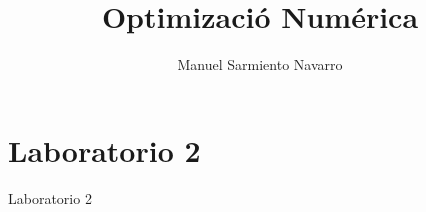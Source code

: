 \documentclass{article}
\begin{document}


\title{Optimizació Numérica}
\author{Manuel Sarmiento Navarro}
\maketitle


% 
\section{Laboratorio 2}
Laboratorio 2
\end{document}
